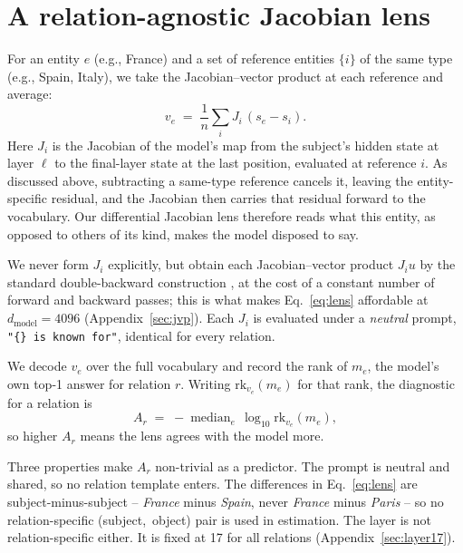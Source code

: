 \documentclass[11pt]{article}
\begin{document}
\section{A relation-agnostic Jacobian lens}
\label{sec:lens}

For an entity $e$ (e.g., France) and a set of reference entities $\{i\}$ of
the same type (e.g., Spain, Italy), we take the Jacobian--vector product
at each reference and average:
\begin{equation}
v_e \;=\; \frac{1}{n}\sum_{i} J_i \,(s_e - s_i).
\label{eq:lens}
\end{equation}
Here $J_i$ is the Jacobian of the model's map from the subject's hidden
state at layer $\ell$ to the final-layer state at the last position,
evaluated at reference $i$.
As discussed above, subtracting a same-type
reference cancels it, leaving the entity-specific residual, and the
Jacobian then carries that residual forward to the
vocabulary. Our differential Jacobian
lens
therefore reads what this entity, as opposed to others of its kind, makes
the model disposed to say.

We never form $J_i$ explicitly, but obtain
each Jacobian--vector product $J_i u$ by the standard double-backward
construction \citep{pearlmutter1994fast}, at the cost of a constant
number of forward and backward passes; this is what makes
Eq.~\ref{eq:lens} affordable at $d_{\text{model}} = 4096$
(Appendix~\ref{sec:jvp}).
Each $J_i$ is evaluated under a \emph{neutral} prompt,
\texttt{"\{\} is known for"}, identical for every relation.

We decode $v_e$
over the full vocabulary and record the rank of $m_e$, the model's own
top-1 answer for relation $r$. Writing
$\mathrm{rk}_{v_e}(m_e)$ for that rank, the diagnostic for a relation is
\begin{equation}
A_r \;=\; -\operatorname{median}_{e}\,\log_{10}\mathrm{rk}_{v_e}(m_e),
\end{equation}
so higher $A_r$ means the lens agrees with the model more.

Three properties make $A_r$ non-trivial as a predictor.
The prompt is
neutral and shared, so no relation template enters. The differences in
Eq.~\ref{eq:lens} are subject-minus-subject -- \emph{France} minus
\emph{Spain}, never \emph{France} minus \emph{Paris} -- so no
relation-specific (subject,~object) pair is used in estimation.
The layer is not relation-specific either. It is fixed at 17 for all
relations (Appendix~\ref{sec:layer17}).
\end{document}
